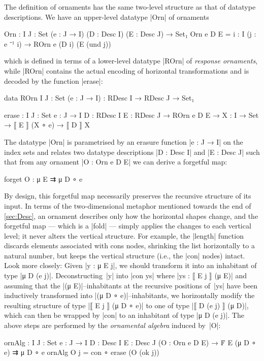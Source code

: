 The definition of ornaments has the same two-level structure as that of datatype descriptions.
We have an upper-level datatype |Orn| of ornaments
\begin{code}
Orn : {I J : Set} (e : J → I) (D : Desc I) (E : Desc J) → Set₁
Orn e D E = {i : I} (j : e ⁻¹ i) → ROrn e (D i) (E (und j))
\end{code}
which is defined in terms of a lower-level datatype |ROrn| of \emph{response ornaments}, while |ROrn| contains the actual encoding of horizontal transformations and is decoded by the function |erase|:
\begin{code}
data ROrn {I J : Set} (e : J → I) : RDesc I → RDesc J → Set₁
           
erase :  {I J : Set} {e : J → I} {D : RDesc I} {E : RDesc J} →
         ROrn e D E → {X : I → Set} → ⟦ E ⟧ (X ∘ e) → ⟦ D ⟧ X
\end{code}
The datatype |Orn| is parametrised by an erasure function |e : J → I| on the index sets and relates two datatype descriptions |D : Desc I| and |E : Desc J| such that from any ornament |O : Orn e D E| we can derive a forgetful map:
\begin{spec}
forget O : μ E ⇉ μ D ∘ e
\end{spec}
By design, this forgetful map necessarily preserves the recursive structure of its input.
In terms of the two-dimensional metaphor mentioned towards the end of \autoref{sec:Desc}, an ornament describes only how the horizontal shapes change, and the forgetful map --- which is a |fold| --- simply applies the changes to each vertical level; it never alters the vertical structure.
For example, the |length| function discards elements associated with cons nodes, shrinking the list horizontally to a natural number, but keeps the vertical structure (i.e., the |con| nodes) intact.
Look more closely:
Given |y : μ E j|, we should transform it into an inhabitant of type |μ D (e j)|.
Deconstructing~|y| into |con ys| where |ys : ⟦ E j ⟧ (μ E)| and assuming that the |(μ E)|--inhabitants at the recursive positions of~|ys| have been inductively transformed into |(μ D ∘ e)|--inhabitants, we horizontally modify the resulting structure of type |⟦ E j ⟧ (μ D ∘ e)| to one of type |⟦ D (e j) ⟧ (μ D)|, which can then be wrapped by |con| to an inhabitant of type |μ D (e j)|.
The above steps are performed by the \emph{ornamental algebra} induced by~|O|:
\begin{code}
ornAlg :  {I J : Set} {e : J → I} {D : Desc I} {E : Desc J}
          (O : Orn e D E) → Ḟ E (μ D ∘ e) ⇉ μ D ∘ e
ornAlg O {j} = con ∘ erase (O (ok j))
\end{code}
